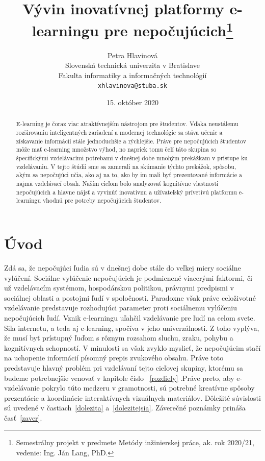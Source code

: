 \documentclass[10pt,twoside,slovak,a4paper]{article}
\title{Vývin inovatívnej platformy e-learningu pre nepočujúcich\thanks{Semestrálny projekt v predmete Metódy inžinierskej práce, ak. rok 2020/21, vedenie: Ing. Ján Lang, PhD.}} %
\author{Petra Hlavinová\\[2pt]
	{\small Slovenská technická univerzita v Bratislave}\\
	{\small Fakulta informatiky a informačných technológií}\\
	{\small \texttt{xhlavinova@stuba.sk}}
	}
\date{\small 15. október 2020} %
\begin{document}
\maketitle

\begin{abstract}
E-learning je čoraz viac atraktívnejším nástrojom pre študentov. Vďaka neustálemu rozširovaniu inteligentných zariadení a modernej technológie sa stáva učenie a získavanie informácií stále jednoduchšie a rýchlejšie. Práve pre nepočujúcich študentov môže mať e-learning množstvo výhod, no napriek tomu čelí táto skupina so špecifickými vzdelávacími potrebami v dnešnej dobe mnohým prekážkam v prístupe ku vzdelávaniu. V tejto štúdii sme sa zamerali na skúmanie týchto prekážok, spôsobu, akým sa nepočujúci učia, ako aj na to, ako by im mali byť prezentované informácie a najmä vzdelávací obsah. Naším cieľom bolo analyzovať kognitívne vlastnosti nepočujúcich a hlavne nájsť a vyvinúť inovatívnu a užívateľský prívetivú platformu e-learningu vhodnú pre potreby nepočujúcich študentov. 
\end{abstract}



\section{Úvod}
\centering
Zdá sa, že nepočujúci ľudia sú v dnešnej dobe stále do veľkej miery sociálne vylúčení. Sociálne vylúčenie nepočujúcich je podmienené viacerými faktormi, či už vzdelávacím systémom, hospodárskou politikou, právnymi predpismi v sociálnej oblasti a postojmi ľudí v spoločnosti. Paradoxne však práve celoživotné vzdelávanie predstavuje rozhodujúci parameter proti sociálnemu vylúčeniu nepočujúcich ľudí. Vznik e-learningu uľahčil vzdelávanie pre ľudí na celom svete. Sila internetu, a teda aj e-learning, spočíva v jeho univerzálnosti. Z toho vyplýva, že musí byť prístupný ľuďom s rôznym rozsahom sluchu, zraku, pohybu a kognitívnych schopností.  V minulosti sa však zvyklo myslieť, že nepočujúcim stačí na uchopenie informácií písomný prepis zvukového obsahu. Práve toto predstavuje hlavný problém pri vzdelávaní tejto cieľovej skupiny, ktorému sa budeme potrebnejšie venovať v kapitole číslo ~\ref{rozdiely} .Práve preto, aby e-vzdelávanie pokrylo túto medzeru v gramotnosti, sú potrebné kreatívne spôsoby prezentácie a koordinácie interaktívnych vizuálnych materiálov.
Dôležité súvislosti sú uvedené v častiach~\ref{dolezita} a~\ref{dolezitejsia}.
Záverečné poznámky prináša časť~\ref{zaver}.
\end{document}

